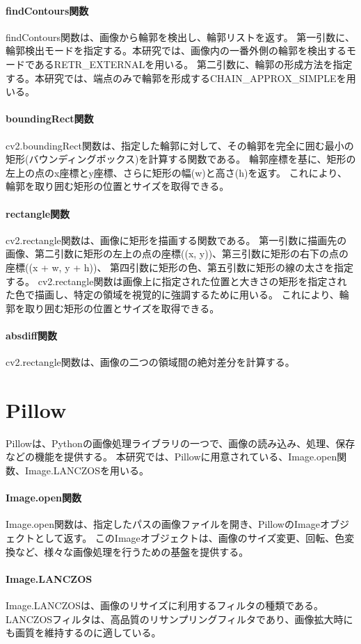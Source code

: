 \paragraph{findContours関数}
findContours関数は、画像から輪郭を検出し、輪郭リストを返す。
第一引数に、輪郭検出モードを指定する。本研究では、画像内の一番外側の輪郭を検出するモードであるRETR\_EXTERNALを用いる。
第二引数に、輪郭の形成方法を指定する。本研究では、端点のみで輪郭を形成するCHAIN\_APPROX\_SIMPLEを用いる。
\paragraph{boundingRect関数}
cv2.boundingRect関数は、指定した輪郭に対して、その輪郭を完全に囲む最小の矩形(バウンディングボックス)を計算する関数である。
輪郭座標を基に、矩形の左上の点のx座標とy座標、さらに矩形の幅(w)と高さ(h)を返す。
これにより、輪郭を取り囲む矩形の位置とサイズを取得できる。
\paragraph{rectangle関数}
cv2.rectangle関数は、画像に矩形を描画する関数である。
第一引数に描画先の画像、第二引数に矩形の左上の点の座標((x, y))、第三引数に矩形の右下の点の座標((x + w, y + h))、
第四引数に矩形の色、第五引数に矩形の線の太さを指定する。
cv2.rectangle関数は画像上に指定された位置と大きさの矩形を指定された色で描画し、特定の領域を視覚的に強調するために用いる。
これにより、輪郭を取り囲む矩形の位置とサイズを取得できる。
\paragraph{absdiff関数}
cv2.rectangle関数は、画像の二つの領域間の絶対差分を計算する。

\section{Pillow}\label{sec:pillow}
Pillow\cite{Pillow}は、Python\cite{Python}の画像処理ライブラリの一つで、画像の読み込み、処理、保存などの機能を提供する。
本研究では、Pillowに用意されている、Image.open関数、Image.LANCZOSを用いる。
\paragraph{Image.open関数}
Image.open関数は、指定したパスの画像ファイルを開き、PillowのImageオブジェクトとして返す。
このImageオブジェクトは、画像のサイズ変更、回転、色変換など、様々な画像処理を行うための基盤を提供する。
\paragraph{Image.LANCZOS}
Image.LANCZOSは、画像のリサイズに利用するフィルタの種類である。
LANCZOSフィルタは、高品質のリサンプリングフィルタであり、画像拡大時にも画質を維持するのに適している。

